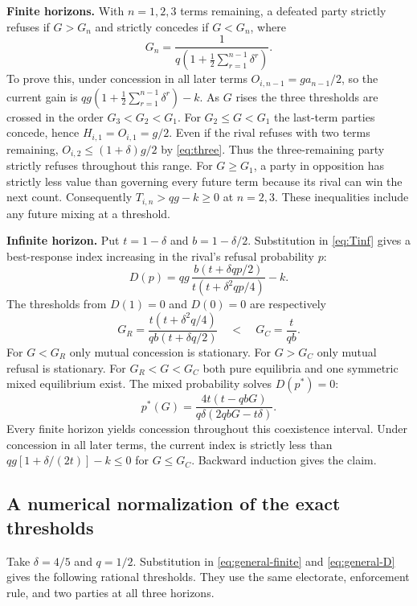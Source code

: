 \documentclass[11pt,letterpaper]{article}
\newcommand{\statement}[1]{\textbf{#1}\enspace}
\begin{document}
\statement{Finite horizons.} With \(n=1,2,3\) terms remaining, a defeated party strictly refuses if \(G>G_n\) and strictly concedes if \(G<G_n\), where
\begin{equation}
 G_n=\frac{1}{q\left(1+\frac12\sum_{r=1}^{n-1}\delta^r\right)} .
 \label{eq:general-finite}
\end{equation}
To prove this, under concession in all later terms \(O_{i,n-1}=g a_{n-1}/2\), so the current gain is \(qg(1+\frac12\sum_{r=1}^{n-1}\delta^r)-k\). As \(G\) rises the three thresholds are crossed in the order \(G_3<G_2<G_1\). For \(G_2\le G<G_1\) the last-term parties concede, hence \(H_{i,1}=O_{i,1}=g/2\). Even if the rival refuses with two terms remaining, \(O_{i,2}\le(1+\delta)g/2\) by \eqref{eq:three}. Thus the three-remaining party strictly refuses throughout this range. For \(G\ge G_1\), a party in opposition has strictly less value than governing every future term because its rival can win the next count. Consequently \(T_{i,n}>qg-k\ge0\) at \(n=2,3\). These inequalities include any future mixing at a threshold.

\statement{Infinite horizon.} Put \(t=1-\delta\) and \(b=1-\delta/2\). Substitution in \eqref{eq:Tinf} gives a best-response index increasing in the rival's refusal probability \(p\):
\begin{equation}
 D(p)=qg\,\frac{b(t+\delta qp/2)}{t(t+\delta^2qp/4)}-k .
 \label{eq:general-D}
\end{equation}
The thresholds from \(D(1)=0\) and \(D(0)=0\) are respectively
\[
 G_R=\frac{t(t+\delta^2q/4)}{qb(t+\delta q/2)}
 \quad<\quad
 G_C=\frac{t}{qb}.
\]
For \(G<G_R\) only mutual concession is stationary. For \(G>G_C\) only mutual refusal is stationary. For \(G_R<G<G_C\) both pure equilibria and one symmetric mixed equilibrium exist. The mixed probability solves \(D(p^*)=0\):
\[
 p^*(G)=\frac{4t(t-qbG)}{q\delta(2qbG-t\delta)} .
\]
Every finite horizon yields concession throughout this coexistence interval. Under concession in all later terms, the current index is strictly less than \(qg[1+\delta/(2t)]-k\le0\) for \(G\le G_C\). Backward induction gives the claim.

\newpage
\subsection*{A numerical normalization of the exact thresholds}
Take \(\delta=4/5\) and \(q=1/2\). Substitution in \eqref{eq:general-finite} and \eqref{eq:general-D} gives the following rational thresholds. They use the same electorate, enforcement rule, and two parties at all three horizons.
\end{document}
